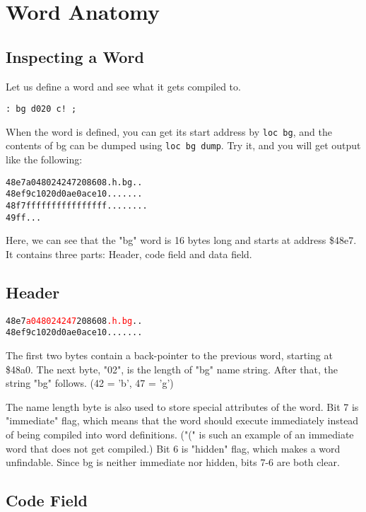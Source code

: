 \chapter{Word Anatomy}

\section{Inspecting a Word}

Let us define a word and see what it gets compiled to.

\begin{verbatim}
: bg d020 c! ;
\end{verbatim}

When the word is defined, you can get its start address by \texttt{loc bg}, and the contents of bg can be dumped using \texttt{loc bg dump}. Try it, and you will get output like the following:

\begin{alltt}
48e7  a0 48 02 42 47 20 86 08 .h.bg ..
48ef  9c 10 20 d0 ae 0a ce 10 .. .....
48f7  ff ff ff ff ff ff ff ff ........
49ff  ...
\end{alltt}

Here, we can see that the "bg" word is 16 bytes long and starts at address \$48e7. It contains three parts: Header, code field and data field.

\section{Header}

\begin{alltt}
48e7  \textcolor{red}{a0 48 02 42 47} 20 86 08 \textcolor{red}{.h.bg} ..
48ef  9c 10 20 d0 ae 0a ce 10 .. .....
\end{alltt}

The first two bytes contain a back-pointer to the previous word, starting at \$48a0. The next byte, "02", is the length of "bg" name string. After that, the string "bg" follows. (42 = 'b', 47 = 'g')

The name length byte is also used to store special attributes of the word. Bit 7 is "immediate" flag, which means that the word should execute immediately instead of being compiled into word definitions. ("(" is such an example of an immediate word that does not get compiled.) Bit 6 is "hidden" flag, which makes a word unfindable. Since bg is neither immediate nor hidden, bits 7-6 are both clear.

\section{Code Field}

